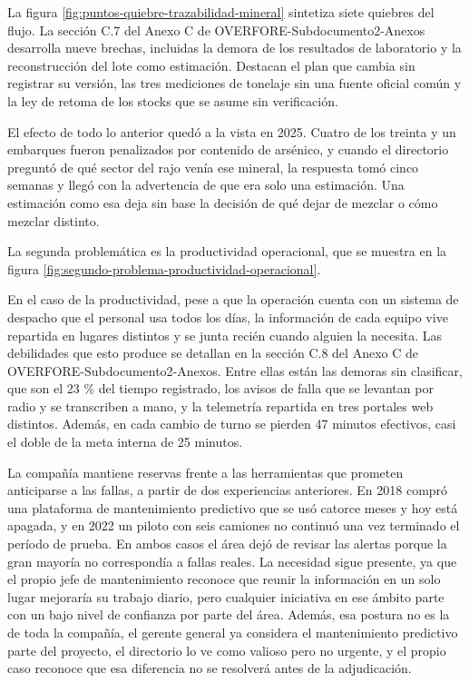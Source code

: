 \documentclass[subdoc]{../../comun/overfore}
\begin{document}
La figura \ref{fig:puntos-quiebre-trazabilidad-mineral} sintetiza siete quiebres del flujo. La sección C.7 del Anexo C de OVERFORE-Subdocumento2-Anexos desarrolla nueve brechas, incluidas la demora de los resultados de laboratorio y la reconstrucción del lote como estimación. Destacan el plan que cambia sin registrar su versión, las tres mediciones de tonelaje sin una fuente oficial común y la ley de retoma de los stocks que se asume sin verificación.

El efecto de todo lo anterior quedó a la vista en 2025. Cuatro de los treinta y un embarques fueron penalizados por contenido de arsénico, y cuando el directorio preguntó de qué sector del rajo venía ese mineral, la respuesta tomó cinco semanas y llegó con la advertencia de que era solo una estimación. Una estimación como esa deja sin base la decisión de qué dejar de mezclar o cómo mezclar distinto.

La segunda problemática es la productividad operacional, que se muestra en la figura \ref{fig:segundo-problema-productividad-operacional}.

En el caso de la productividad, pese a que la operación cuenta con un sistema de despacho que el personal usa todos los días, la información de cada equipo vive repartida en lugares distintos y se junta recién cuando alguien la necesita. Las debilidades que esto produce se detallan en la sección C.8 del Anexo C de OVERFORE-Subdocumento2-Anexos. Entre ellas están las demoras sin clasificar, que son el 23 \% del tiempo registrado, los avisos de falla que se levantan por radio y se transcriben a mano, y la telemetría repartida en tres portales web distintos. Además, en cada cambio de turno se pierden 47 minutos efectivos, casi el doble de la meta interna de 25 minutos.

La compañía mantiene reservas frente a las herramientas que prometen anticiparse a las fallas, a partir de dos experiencias anteriores. En 2018 compró una plataforma de mantenimiento predictivo que se usó catorce meses y hoy está apagada, y en 2022 un piloto con seis camiones no continuó una vez terminado el período de prueba. En ambos casos el área dejó de revisar las alertas porque la gran mayoría no correspondía a fallas reales. La necesidad sigue presente, ya que el propio jefe de mantenimiento reconoce que reunir la información en un solo lugar mejoraría su trabajo diario, pero cualquier iniciativa en ese ámbito parte con un bajo nivel de confianza por parte del área. Además, esa postura no es la de toda la compañía, el gerente general ya considera el mantenimiento predictivo parte del proyecto, el directorio lo ve como valioso pero no urgente, y el propio caso reconoce que esa diferencia no se resolverá antes de la adjudicación.
\end{document}
